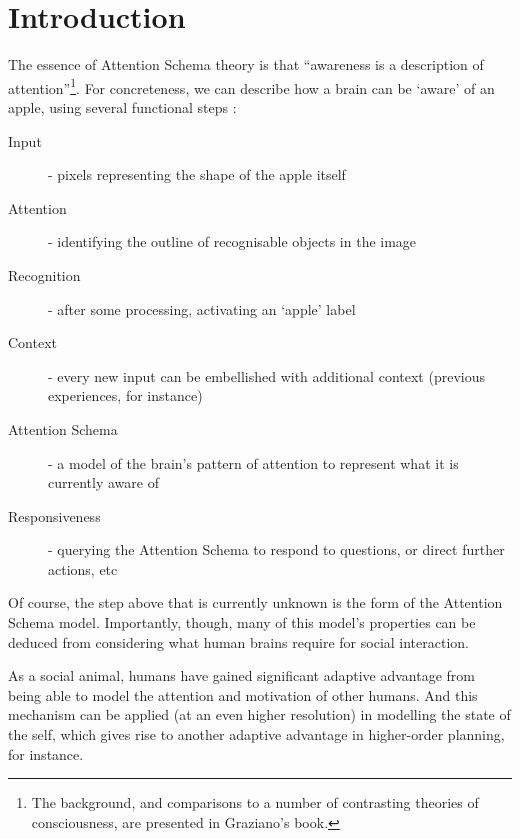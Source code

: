 \documentclass[citeauthoryear]{llncs}
\begin{document}
\section{Introduction}

The essence of Attention Schema theory is that ``awareness is a description of 
attention''\footnote{The background, and comparisons to a number of contrasting theories of consciousness,
are presented in Graziano's \cite{graziano2013consciousness} book.}.
For concreteness, we can describe how a brain can be `aware' of an apple,
using several functional steps :

\begin{description}
\item[Input] - pixels representing the shape of the apple itself
\item[Attention] - identifying the outline of recognisable objects in the image 
\item[Recognition] - after some processing, activating an `apple' label
\item[Context] - every new input can be embellished with additional context (previous experiences, for instance)
\item[Attention Schema] - a model of the brain's pattern of attention to represent what it is currently aware of
\item[Responsiveness] - querying the Attention Schema to respond to questions, or direct further actions, etc
\end{description}

Of course, the step above that is currently unknown is the form of the Attention Schema model.  
Importantly, though, many of this model's properties can be deduced from considering 
what human brains require for social interaction.

As a social animal, humans have gained significant adaptive advantage from 
being able to model the attention and motivation of other humans.  
%
And this mechanism can be applied (at an even higher resolution) in 
modelling the state of the self, which gives rise to another adaptive advantage
in higher-order planning, for instance. 
%



\end{document}

